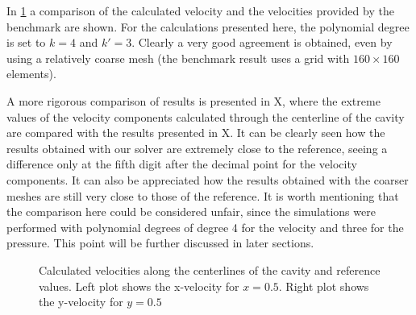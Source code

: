 In \cref{fig:LidVelocities} a comparison of the calculated velocity and the velocities provided by the benchmark are shown. For the calculations presented here, the polynomial degree is set to $k = 4$ and $k' = 3$. Clearly a very good agreement is obtained, even by using a relatively coarse mesh (the benchmark result uses a grid with $160\times160$ elements). 

A more rigorous comparison of results is presented in X, where the extreme values of the velocity components calculated through the centerline of the cavity are compared with the results presented in X. It can be clearly seen how the results obtained with our solver are extremely close to the reference, seeing a difference only at the fifth digit after the decimal point for the velocity components. It can also be appreciated how the results obtained with the coarser meshes are still very close to those of the reference. It is worth mentioning that the comparison here could be considered unfair, since the simulations were performed with polynomial degrees of degree 4 for the velocity and three for the pressure. This point will be further discussed in later sections. 

\newpage
	\begin{figure}[tb]
		\caption{Calculated velocities along the centerlines of the cavity and reference values. Left plot shows the x-velocity for $x = 0.5$. Right plot shows the y-velocity for $y = 0.5$  }
		\label{fig:LidVelocities}
	\end{figure}


